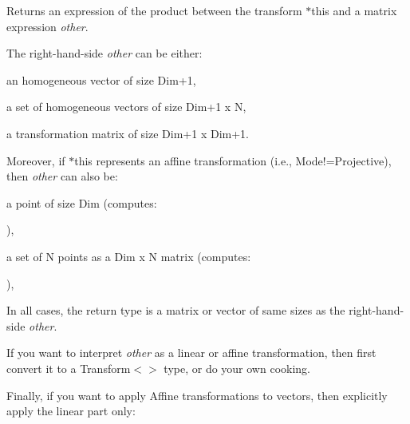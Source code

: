 \begin{DoxyReturn}{Returns}
an expression of the product between the transform {\ttfamily $\ast$this} and a matrix expression {\itshape other}.
\end{DoxyReturn}
The right-\/hand-\/side {\itshape other} can be either\+: \begin{DoxyItemize}
\item an homogeneous vector of size Dim+1, \item a set of homogeneous vectors of size Dim+1 x N, \item a transformation matrix of size Dim+1 x Dim+1.\end{DoxyItemize}
Moreover, if {\ttfamily $\ast$this} represents an affine transformation (i.\+e., Mode!=Projective), then {\itshape other} can also be\+: \begin{DoxyItemize}
\item a point of size Dim (computes\+:
\begin{DoxyCode}{0}
\end{DoxyCode}
), \item a set of N points as a Dim x N matrix (computes\+:
\begin{DoxyCode}{0}
\end{DoxyCode}
),\end{DoxyItemize}
In all cases, the return type is a matrix or vector of same sizes as the right-\/hand-\/side {\itshape other}.

If you want to interpret {\itshape other} as a linear or affine transformation, then first convert it to a Transform$<$$>$ type, or do your own cooking.

Finally, if you want to apply Affine transformations to vectors, then explicitly apply the linear part only\+: 
\begin{DoxyCode}{0}
\end{DoxyCode}
 \mbox{\label{class_eigen_1_1_transform_a27fcd229f83b104448d753298fc00df4}} 
